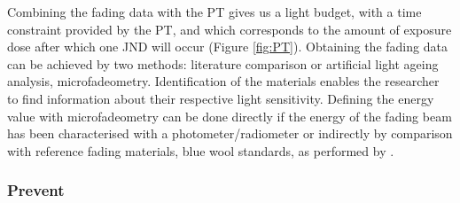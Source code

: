 Combining the fading data with the \gls{PT} gives us a light budget, with a time constraint provided by the \gls{PT}, and which corresponds to the amount of exposure dose after which one \gls{JND} will occur (Figure \ref{fig:PT}). Obtaining the fading data can be achieved by two methods: literature comparison or artificial light ageing analysis, \ie microfadeometry. Identification of the materials enables the researcher to find information about their respective light sensitivity. Defining the energy value with microfadeometry can be done directly if the energy of the fading beam has been characterised with a photometer/radiometer or indirectly by comparison with reference fading materials, \ie blue wool standards, as performed by \citet[803–4]{fieberg_paintings_2017}. \\



\subsubsection{Prevent}

